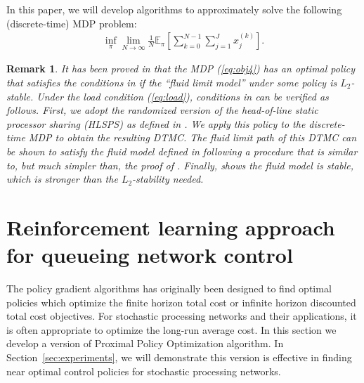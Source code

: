 \documentclass[11pt]{article}
\newcommand{\E}{\mathbb{E}}
\newtheorem{remark}{Remark}
\theoremstyle{definition}
\numberwithin{equation}{section}
\begin{document}
In this paper, we will develop  algorithms to approximately solve the following (discrete-time) MDP problem:
\begin{align}\label{eq:obj4}
 \inf\limits_\pi \lim\limits_{N\rightarrow \infty} \frac{1}{N} \E_{\pi}\left[ \sum\limits_{k=0}^{N-1}\sum\limits_{j=1}^J x_j^{(k)} \right].
\end{align}
\begin{remark}

It has been proved in \cite{Meyn1997} that the MDP (\ref{eq:obj4}) has an optimal policy
that satisfies the conditions in \cite[Theorem 3.6]{Beutler1987} if the ``fluid limit model'' under
some policy is $L_2$-stable.  Under the load condition (\ref{eq:load}),
conditions in \cite{Meyn1997} can be verified as follows. First, we adopt the randomized
version of the head-of-line static processor sharing (HLSPS) as defined in
\cite[Section 4.6]{DaiHarr2020}. We apply this policy to the
discrete-time MDP to obtain the resulting DTMC.  The fluid limit path
of this DTMC can be shown to satisfy the fluid model defined in  \cite[Definition 8.17]{DaiHarr2020} following a procedure that is similar to,
but much simpler than, the proof of \cite[Theorem 12.24]{DaiHarr2020}. Finally, \cite[Theorem 8.18]{DaiHarr2020} shows the fluid model is stable, which is
stronger than the $L_2$-stability needed.

\end{remark}



\section{Reinforcement learning approach for queueing network control}\label{sec:countable}


The policy gradient algorithms has originally been designed to find
optimal policies which optimize the finite horizon total cost or
infinite horizon discounted total cost objectives. For
  stochastic processing networks and their applications, it is often
  appropriate to optimize the long-run average cost. In this section
we develop a version of Proximal Policy Optimization algorithm. In
Section~\ref{sec:experiments}, we will demonstrate this version is
effective in finding near optimal control policies for stochastic
processing networks.
\end{document}
